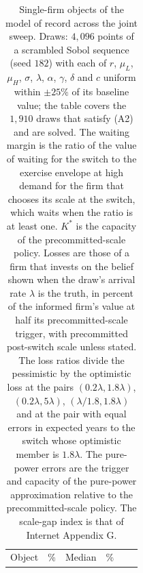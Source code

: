 \documentclass[
  11pt,
  letterpaper,
]{scrartcl}
\begin{document}
\begin{longtable}[]{@{}
  >{\raggedright\arraybackslash}p{}
  >{\raggedleft\arraybackslash}p{}
  >{\raggedleft\arraybackslash}p{}
  >{\raggedleft\arraybackslash}p{}
  >{\raggedleft\arraybackslash}p{}
  >{\raggedleft\arraybackslash}p{}@{}}
\caption{Single-firm objects of the model of record across the joint
sweep. Draws: \(4{,}096\) points of a scrambled Sobol sequence (seed
\(182\)) with each of \(r\), \(\mu_L\), \(\mu_H\), \(\sigma\),
\(\lambda\), \(\alpha\), \(\gamma\), \(\delta\) and \(c\) uniform within
\(\pm 25\%\) of its baseline value; the table covers the \(1{,}910\)
draws that satisfy (A2) and are solved. The waiting margin is the ratio
of the value of waiting for the switch to the exercise envelope at high
demand for the firm that chooses its scale at the switch, which waits
when the ratio is at least one. \(K^*\) is the capacity of the
precommitted-scale policy. Losses are those of a firm that invests on
the belief shown when the draw's arrival rate \(\lambda\) is the truth,
in percent of the informed firm's value at half its precommitted-scale
trigger, with precommitted post-switch scale unless stated. The loss
ratios divide the pessimistic by the optimistic loss at the pairs
\((0.2\lambda, 1.8\lambda)\), \((0.2\lambda, 5\lambda)\),
\((\lambda/1.8, 1.8\lambda)\) and at the pair with equal errors in
expected years to the switch whose optimistic member is \(1.8\lambda\).
The pure-power errors are the trigger and capacity of the pure-power
approximation relative to the precommitted-scale policy. The scale-gap
index is that of Internet Appendix
G.}\label{tbl-joint-sweep}\tabularnewline
\toprule\noalign{}
\begin{minipage}[b]{\linewidth}\raggedright
Object
\end{minipage} & \begin{minipage}[b]{\linewidth}\raggedleft
5\%
\end{minipage} & \begin{minipage}[b]{\linewidth}\raggedleft
Median
\end{minipage} & \begin{minipage}[b]{\linewidth}\raggedleft
95\%
\end{minipage} & \begin{minipage}[b]{\linewidth}\raggedleft

\end{minipage}
\end{longtable}
\end{document}
